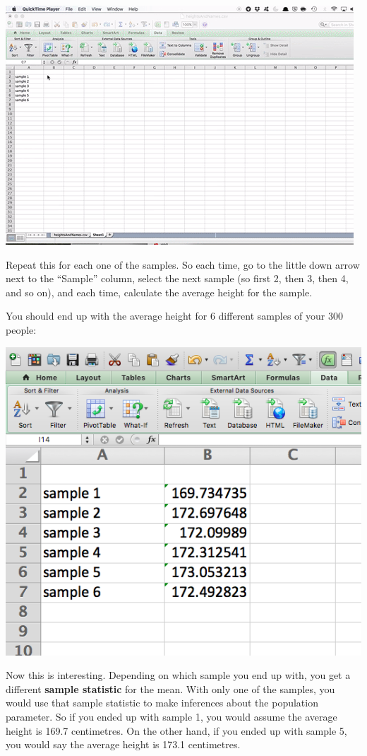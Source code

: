\documentclass[]{book}
\theoremstyle{definition}
\theoremstyle{definition}
\theoremstyle{definition}
\theoremstyle{remark}
\begin{document}
\includegraphics{imgs/avg_sample_1.gif}

Repeat this for each one of the samples. So each time, go to the little
down arrow next to the ``Sample'' column, select the next sample (so
first 2, then 3, then 4, and so on), and each time, calculate the
average height for the sample.

You should end up with the average height for 6 different samples of
your 300 people:

\includegraphics{imgs/avg_per_sample.png}

Now this is interesting. Depending on which sample you end up with, you
get a different \textbf{sample statistic} for the mean. With only one of
the samples, you would use that sample statistic to make inferences
about the population parameter. So if you ended up with sample 1, you
would assume the average height is 169.7 centimetres. On the other hand,
if you ended up with sample 5, you would say the average height is 173.1
centimetres.
\end{document}
